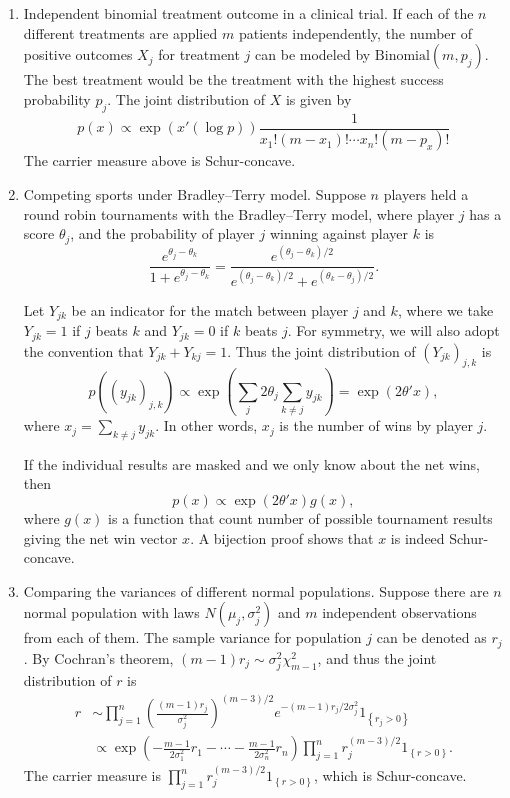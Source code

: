 \documentclass[11pt]{article}
\begin{document}
\begin{enumerate}
\item Independent binomial treatment outcome in a clinical trial. If each of the $n$ different treatments are applied $m$ patients independently, the number of positive outcomes $X_j$ for treatment $j$ can be modeled by $\text{Binomial}\left(m, p_j\right)$. The best treatment would be the treatment with the highest success probability $p_j$. The joint distribution of $X$ is given by
$$p\left(x\right) \propto \exp\left(x' \left(\log p\right)\right) \frac{1}{x_1! \left(m-x_1\right)! \cdots x_n! \left(m-p_x\right)!}$$
The carrier measure above is Schur-concave.

\item Competing sports under Bradley--Terry model. Suppose $n$ players held a round robin tournaments with the Bradley--Terry model, where player $j$ has a score $\theta_j$, and the probability of player $j$ winning against player $k$ is
$$\frac{e^{\theta_j - \theta_k}}{1 + e^{\theta_j - \theta_k}} = \frac{e^{\left(\theta_j - \theta_k\right) / 2}}{e^{\left(\theta_j - \theta_k\right) / 2} + e^{\left(\theta_k - \theta_j\right) / 2}}.$$

Let $Y_{jk}$ be an indicator for the match between player $j$ and $k$, where we take $Y_{jk} = 1$ if $j$ beats $k$ and $Y_{jk} = 0$ if $k$ beats $j$. For symmetry, we will also adopt the convention that $Y_{jk} + Y_{kj} = 1$. Thus the joint distribution of $\left(Y_{jk}\right)_{j, k}$ is
$$p\left(\left(y_{jk}\right)_{j, k}\right) \propto \exp\left(\sum_j 2\theta_j \sum_{k \ne j} y_{jk}\right)  = \exp\left(2\theta' x\right),$$
where $x_j = \sum_{k \ne j} y_{jk}$. In other words, $x_j$ is the number of wins by player $j$.

If the individual results are masked and we only know about the net wins, then
$$p\left(x\right) \propto \exp\left(2\theta' x\right) g\left(x\right),$$
where $g\left(x\right)$ is a function that count number of possible tournament results giving the net win vector $x$. A bijection proof shows that $x$ is indeed Schur-concave.

\item Comparing the variances of different normal populations. Suppose there are $n$ normal population with laws $N\left(\mu_j, \sigma_j^2\right)$ and $m$ independent observations from each of them. The sample variance for population $j$ can be denoted as $r_j$. By Cochran's theorem, $\left(m-1\right) r_j \sim \sigma_j^2 \chi_{m-1}^2$, and thus the joint distribution of $r$ is
\begin{align*}
r & \sim \prod_{j=1}^n \left(\frac{\left(m-1\right) r_j}{\sigma_j^2}\right)^{\left(m-3\right) / 2} e^{-\left(m-1\right) r_j / 2 \sigma_j^2} 1_{\left\{r_j > 0 \right\}} \\
& \propto \exp\left(-\frac{m-1}{2 \sigma_1^2} r_1 - \cdots - \frac{m-1}{2 \sigma_n^2} r_n\right) \prod_{j=1}^n r_j^{\left(m-3\right) / 2} 1_{\left\{r > 0\right\}}.
\end{align*}
The carrier measure is $\prod_{j=1}^n r_j^{\left(m-3\right) / 2} 1_{\left\{r > 0\right\}}$, which is Schur-concave.
\end{enumerate}
\end{document}
